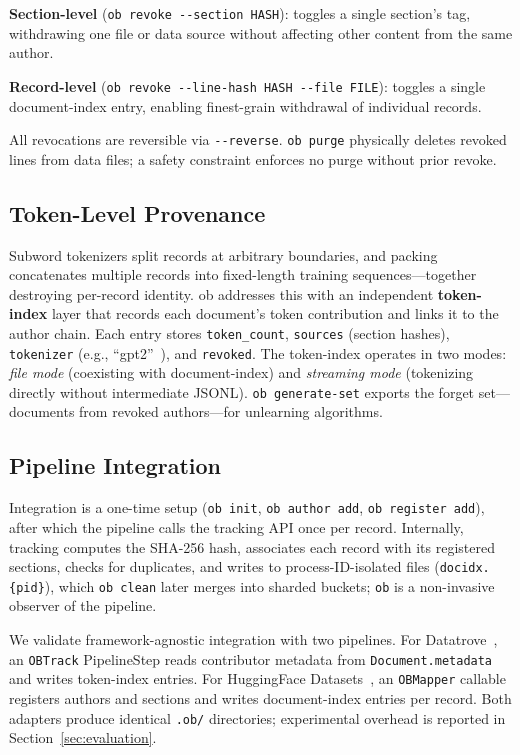 \noindent\textbf{Section-level} (\texttt{ob revoke -{}-section HASH}): toggles a single section's tag, withdrawing one file or data source without affecting other content from the same author.

\noindent\textbf{Record-level} (\texttt{ob revoke -{}-line-hash HASH -{}-file FILE}): toggles a single document-index entry, enabling finest-grain withdrawal of individual records.

All revocations are reversible via \texttt{-{}-reverse}. \texttt{ob purge} physically deletes revoked lines from data files; a safety constraint enforces no purge without prior revoke.

\subsection{Token-Level Provenance}

Subword tokenizers split records at arbitrary boundaries, and packing concatenates multiple records into fixed-length training sequences---together destroying per-record identity. ob addresses this with an independent \textbf{token-index} layer that records each document's token contribution and links it to the author chain. Each entry stores \texttt{token\_count}, \texttt{sources} (section hashes), \texttt{tokenizer} (e.g., ``gpt2''~\cite{radford2019gpt2}), and \texttt{revoked}. The token-index operates in two modes: \emph{file mode} (coexisting with document-index) and \emph{streaming mode} (tokenizing directly without intermediate JSONL). \texttt{ob generate-set} exports the forget set---documents from revoked authors---for unlearning algorithms.

\subsection{Pipeline Integration}

Integration is a one-time setup (\texttt{ob init}, \texttt{ob author add}, \texttt{ob register add}), after which the pipeline calls the tracking API once per record. Internally, tracking computes the SHA-256 hash, associates each record with its registered sections, checks for duplicates, and writes to process-ID-isolated files (\texttt{docidx.\{pid\}}), which \texttt{ob clean} later merges into sharded buckets; \texttt{ob} is a non-invasive observer of the pipeline.

We validate framework-agnostic integration with two pipelines. For Datatrove~\cite{penedo2024datatrove}, an \texttt{OBTrack} PipelineStep reads contributor metadata from \texttt{Document.metadata} and writes token-index entries. For HuggingFace Datasets~\cite{lhoest2021datasets}, an \texttt{OBMapper} callable registers authors and sections and writes document-index entries per record. Both adapters produce identical \texttt{.ob/} directories; experimental overhead is reported in Section~\ref{sec:evaluation}.
